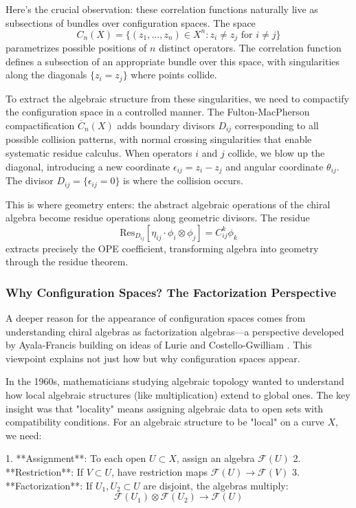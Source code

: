 Here's the crucial observation: these correlation functions naturally live as subsections of bundles over configuration spaces. The space 
$$C_n(X) = \{(z_1, \ldots, z_n) \in X^n : z_i \neq z_j \text{ for } i \neq j\}$$
parametrizes possible positions of $n$ distinct operators. The correlation function defines a subsection of an appropriate bundle over this space, with singularities along the diagonals $\{z_i = z_j\}$ where points collide.

To extract the algebraic structure from these singularities, we need to compactify the configuration space in a controlled manner. The Fulton-MacPherson compactification $\overline{C}_n(X)$ adds boundary divisors $D_{ij}$ corresponding to all possible collision patterns, with normal crossing singularities that enable systematic residue calculus. When operators $i$ and $j$ collide, we blow up the diagonal, introducing a new coordinate $\epsilon_{ij} = z_i - z_j$ and angular coordinate $\theta_{ij}$. The divisor $D_{ij} = \{\epsilon_{ij} = 0\}$ is where the collision occurs.

This is where geometry enters: the abstract algebraic operations of the chiral algebra become residue operations along geometric divisors. The residue
$$\text{Res}_{D_{ij}}[\eta_{ij} \cdot \phi_i \otimes \phi_j] = C^k_{ij} \phi_k$$
extracts precisely the OPE coefficient, transforming algebra into geometry through the residue theorem.

\subsubsection{Why Configuration Spaces? The Factorization Perspective}

A deeper reason for the appearance of configuration spaces comes from understanding chiral algebras as factorization algebras—a perspective developed by Ayala-Francis \cite{AF15} building on ideas of Lurie \cite{HA} and Costello-Gwilliam \cite{CG17}. This viewpoint explains not just how but why configuration spaces appear.

In the 1960s, mathematicians studying algebraic topology wanted to understand how local algebraic structures (like multiplication) extend to global ones. The key insight was that "locality" means assigning algebraic data to open sets with compatibility conditions. For an algebraic structure to be "local" on a curve $X$, we need:

1. **Assignment**: To each open $U \subset X$, assign an algebra $\mathcal{F}(U)$
2. **Restriction**: If $V \subset U$, have restriction maps $\mathcal{F}(U) \to \mathcal{F}(V)$
3. **Factorization**: If $U_1, U_2 \subset U$ are disjoint, the algebras multiply:
   $$\mathcal{F}(U_1) \otimes \mathcal{F}(U_2) \to \mathcal{F}(U)$$

